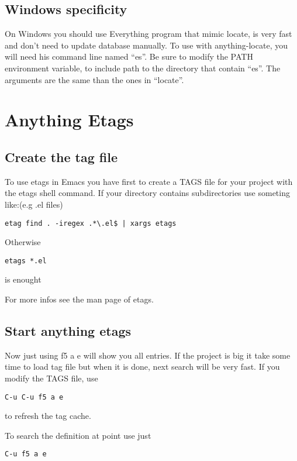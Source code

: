 \documentclass[a4paper,11pt]{article}
\begin{document}
\subsection{Windows specificity}
\label{sec:windows-specificity}

On Windows you should use Everything program that mimic locate, is very fast and don't need to
update database manually.
To use with anything-locate, you will need his command line named ``es''.
Be sure to modify the PATH environment variable, to include path to the directory that contain ``es''.
The arguments are the same than the ones in ``locate''.

\section{Anything Etags}
\label{sec:anything-etags}

\subsection{Create the tag file}
\label{sec:create-tag-file}


To use etags in Emacs you have first to create a TAGS file for your project with the etags shell command.
If your directory contains subdirectories use someting like:(e.g .el files)
\begin{verbatim}
etag find . -iregex .*\.el$ | xargs etags
\end{verbatim}
Otherwise
\begin{verbatim}
etags *.el
\end{verbatim}
is enought

For more infos see the man page of etags.

\subsection{Start anything etags}
\label{sec:start-anything-etags}


Now just using f5 a e will show you all entries.
If the project is big it take some time to load tag file but when it is done, next search will be very fast.
If you modify the TAGS file, use
\begin{verbatim}
C-u C-u f5 a e
\end{verbatim}
to refresh the tag cache.

To search the definition at point use just
\begin{verbatim}
C-u f5 a e
\end{verbatim}
\end{document}
